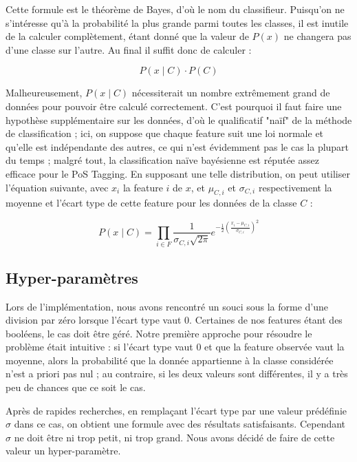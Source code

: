 \documentclass[french, 14pt]{memoir}
\begin{document}
Cette formule est le théorème de Bayes, d'où le nom du classifieur. Puisqu'on ne s'intéresse qu'à la probabilité la plus grande parmi toutes les classes, il est inutile de la calculer complètement, étant donné que la valeur de $P(x)$ ne changera pas d'une classe sur l'autre. Au final il suffit donc de calculer :

\begin{equation}
P(x \mid C) \cdot P(C)
\end{equation}

Malheureusement, $P(x \mid C)$ nécessiterait un nombre extrêmement grand de données pour pouvoir être calculé correctement. C'est pourquoi il faut faire une hypothèse supplémentaire sur les données, d'où le qualificatif "naïf" de la méthode de classification ; ici, on suppose que chaque feature suit une loi normale et qu'elle est indépendante des autres, ce qui n'est évidemment pas le cas la plupart du temps ; malgré tout, la classification naïve bayésienne est réputée assez efficace pour le PoS Tagging. En supposant une telle distribution, on peut utiliser l'équation suivante, avec $x_i$ la feature $i$ de $x$, et $\mu_{C,i}$ et $\sigma_{C,i}$ respectivement la moyenne et l'écart type de cette feature pour les données de la classe $C$ :

\begin{equation}
P(x \mid C) = \prod _{i \in F} \frac{1}{\sigma_{C,i} \sqrt{2 \pi}} e^{-\frac {1} {2} (\frac {x_i - \mu_{C,i}} {\sigma_{C,i}})^2}
\end{equation}


\subsection{Hyper-paramètres}
Lors de l'implémentation, nous avons rencontré un souci sous la forme d'une division par zéro lorsque l'écart type vaut 0. Certaines de nos features étant des booléens, le cas doit être géré. Notre première approche pour résoudre le problème était intuitive : si l'écart type vaut 0 et que la feature observée vaut la moyenne, alors la probabilité que la donnée appartienne à la classe considérée n'est a priori pas nul ; au contraire, si les deux valeurs sont différentes, il y a très peu de chances que ce soit le cas.

Après de rapides recherches, en remplaçant l'écart type par une valeur prédéfinie $\sigma$ dans ce cas, on obtient une formule avec des résultats satisfaisants. Cependant $\sigma$ ne doit être ni trop petit, ni trop grand. Nous avons décidé de faire de cette valeur un hyper-paramètre.
\end{document}
